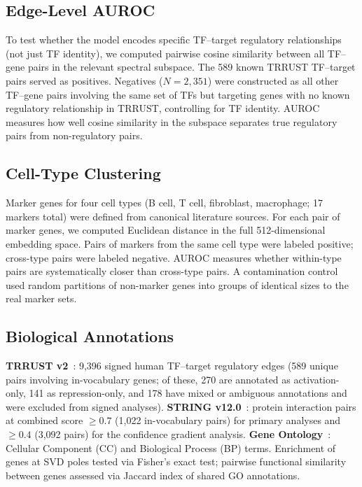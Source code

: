 \documentclass[12pt]{article}
\begin{document}
\subsection{Edge-Level AUROC}
To test whether the model encodes specific TF--target regulatory relationships (not just TF identity), we computed pairwise cosine similarity between all TF--gene pairs in the relevant spectral subspace.
The 589 known TRRUST TF--target pairs served as positives.
Negatives ($N = 2{,}351$) were constructed as all other TF--gene pairs involving the same set of TFs but targeting genes with no known regulatory relationship in TRRUST, controlling for TF identity.
AUROC measures how well cosine similarity in the subspace separates true regulatory pairs from non-regulatory pairs.

\subsection{Cell-Type Clustering}
Marker genes for four cell types (B cell, T cell, fibroblast, macrophage; 17 markers total) were defined from canonical literature sources.
For each pair of marker genes, we computed Euclidean distance in the full 512-dimensional embedding space.
Pairs of markers from the same cell type were labeled positive; cross-type pairs were labeled negative.
AUROC measures whether within-type pairs are systematically closer than cross-type pairs.
A contamination control used random partitions of non-marker genes into groups of identical sizes to the real marker sets.

\subsection{Biological Annotations}
\textbf{TRRUST v2}~\cite{han2018trrust}: 9{,}396 signed human TF--target regulatory edges (589 unique pairs involving in-vocabulary genes; of these, 270 are annotated as activation-only, 141 as repression-only, and 178 have mixed or ambiguous annotations and were excluded from signed analyses).
\textbf{STRING v12.0}~\cite{szklarczyk2023string}: protein interaction pairs at combined score $\geq 0.7$ (1{,}022 in-vocabulary pairs) for primary analyses and $\geq 0.4$ (3{,}092 pairs) for the confidence gradient analysis.
\textbf{Gene Ontology}~\cite{ashburner2000gene}: Cellular Component (CC) and Biological Process (BP) terms.
Enrichment of genes at SVD poles tested via Fisher's exact test; pairwise functional similarity between genes assessed via Jaccard index of shared GO annotations.
\end{document}
